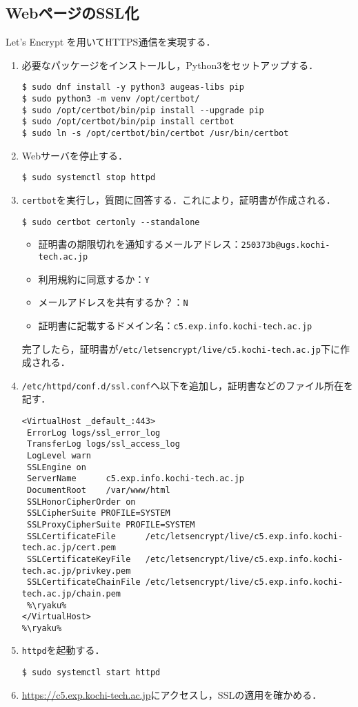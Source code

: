 \subsection{WebページのSSL化}
Let's Encrypt を用いてHTTPS通信を実現する．
\begin{enumerate}
    \item 必要なパッケージをインストールし，Python3をセットアップする．
          \begin{lstlisting}
$ sudo dnf install -y python3 augeas-libs pip
$ sudo python3 -m venv /opt/certbot/
$ sudo /opt/certbot/bin/pip install --upgrade pip
$ sudo /opt/certbot/bin/pip install certbot
$ sudo ln -s /opt/certbot/bin/certbot /usr/bin/certbot
\end{lstlisting}
    \item Webサーバを停止する．
          \begin{lstlisting}
$ sudo systemctl stop httpd
\end{lstlisting}
    \item \texttt{certbot}を実行し，質問に回答する．これにより，証明書が作成される．
          \begin{lstlisting}
$ sudo certbot certonly --standalone
\end{lstlisting}
          \begin{itemize}
              \item 証明書の期限切れを通知するメールアドレス：\texttt{250373b@ugs.kochi-tech.ac.jp}
              \item 利用規約に同意するか：\texttt{Y}
              \item メールアドレスを共有するか？：\texttt{N}
              \item 証明書に記載するドメイン名：\texttt{c5.exp.info.kochi-tech.ac.jp}
          \end{itemize}
          完了したら，証明書が\texttt{/etc/letsencrypt/live/c5.kochi-tech.ac.jp}下に作成される．
    \item \texttt{/etc/httpd/conf.d/ssl.conf}へ以下を追加し，証明書などのファイル所在を記す．
          \begin{lstlisting}[style=file,caption={\ttfamily /etc/httpd/conf.d/ssl.conf}]
%\ryaku%
<VirtualHost _default_:443>
 ErrorLog logs/ssl_error_log
 TransferLog logs/ssl_access_log
 LogLevel warn
 SSLEngine on
 ServerName      c5.exp.info.kochi-tech.ac.jp
 DocumentRoot    /var/www/html
 SSLHonorCipherOrder on
 SSLCipherSuite PROFILE=SYSTEM
 SSLProxyCipherSuite PROFILE=SYSTEM
 SSLCertificateFile      /etc/letsencrypt/live/c5.exp.info.kochi-tech.ac.jp/cert.pem
 SSLCertificateKeyFile   /etc/letsencrypt/live/c5.exp.info.kochi-tech.ac.jp/privkey.pem
 SSLCertificateChainFile /etc/letsencrypt/live/c5.exp.info.kochi-tech.ac.jp/chain.pem        
 %\ryaku%
</VirtualHost>
%\ryaku%
    \end{lstlisting}
    \item \texttt{httpd}を起動する．
          \begin{lstlisting}
$ sudo systemctl start httpd
\end{lstlisting}
    \item \url{https://c5.exp.kochi-tech.ac.jp}にアクセスし，SSLの適用を確かめる．
\end{enumerate}
